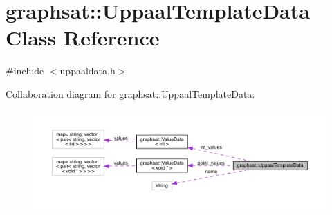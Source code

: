 \hypertarget{classgraphsat_1_1_uppaal_template_data}{}\section{graphsat\+::Uppaal\+Template\+Data Class Reference}
\label{classgraphsat_1_1_uppaal_template_data}


{\ttfamily \#include $<$uppaaldata.\+h$>$}



Collaboration diagram for graphsat\+::Uppaal\+Template\+Data\+:
\nopagebreak
\begin{figure}[H]
\begin{center}
\leavevmode
\includegraphics[width=350pt]{classgraphsat_1_1_uppaal_template_data__coll__graph}
\end{center}
\end{figure}
